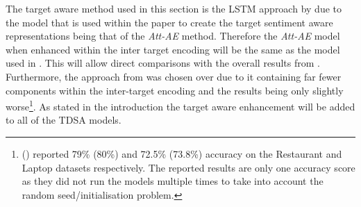 The target aware method used in this section is the LSTM approach by \citet{hazarika-etal-2018-modeling} due to the model that is used within the paper to create the target sentiment aware representations being that of the \textit{Att-AE} method. Therefore the \textit{Att-AE} model when enhanced within the inter target encoding will be the same as the model used in \citet{hazarika-etal-2018-modeling}. This will allow direct comparisons with the overall results from \citet{hazarika-etal-2018-modeling}. Furthermore, the approach from \citet{hazarika-etal-2018-modeling} was chosen over \citet{majumder-etal-2018-iarm} due to it containing far fewer components within the inter-target encoding and the results being only slightly worse\footnote{\citet{hazarika-etal-2018-modeling} (\citet{majumder-etal-2018-iarm}) reported 79\% (80\%) and 72.5\% (73.8\%) accuracy on the Restaurant and Laptop datasets respectively. The reported results are only one accuracy score as they did not run the models multiple times to take into account the random seed/initialisation problem.}. As stated in the introduction the target aware enhancement will be added to all of the TDSA models.



\FloatBarrier
